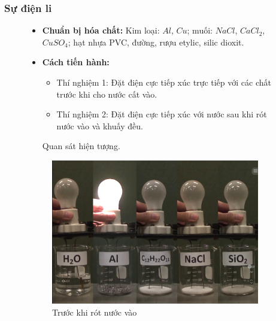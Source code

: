 \subsubsection{Sự điện li}
\begin{figure}[!htp]
	\begin{hopdongian}[\mauphu]
		{
			\begin{itemize}
				\item \textbf{Chuẩn bị hóa chất:} Kim loại: $Al$, $Cu$; muối: $NaCl$, $CaCl_2$, $CuSO_4$; hạt nhựa PVC, đường, rượu etylic, silic dioxit.
				\item \textbf{Cách tiến hành:}
				\begin{itemize}
					\item Thí nghiệm 1: Đặt điện cực tiếp xúc trực tiếp với các chất trước khi cho nước cất vào.
					\item Thí nghiệm 2: Đặt điện cực tiếp xúc với nước sau khi rót nước vào và khuấy đều.
				\end{itemize}
				Quan sát hiện tượng.
			\end{itemize}
		}
		\begin{center}
			\begin{subfigure}[b]{0.23\textwidth}
				\centering
				\includegraphics[height=0.7\textwidth]{Images/anhhoa11/dodandien_1.png}
				\caption{Trước khi rót nước vào}
				\label{subfig:TNsudienli1}
			\end{subfigure}
			\begin{subfigure}[b]{0.23\textwidth}
				\centering

\end{subfigure}
\end{center}
\end{hopdongian}
\end{figure}
